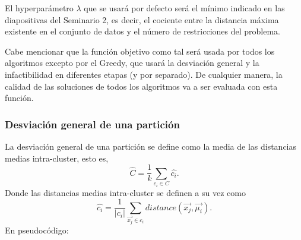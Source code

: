 \documentclass[11pt,a4paper]{article}
\begin{document}
	El hyperparámetro $\lambda$ que se usará por defecto será el mínimo indicado en las diapositivas del Seminario 2, es decir, el cociente entre la distancia máxima existente en el conjunto de datos y el número de restricciones del problema. 
	
	Cabe mencionar que la función objetivo como tal será usada por todos los algoritmos excepto por el Greedy, que usará la desviación general y la infactibilidad en diferentes etapas (y por separado). De cualquier manera, la calidad de las soluciones de todos los algoritmos va a ser evaluada con esta función.
	\subsubsection{Desviación general de una partición}
	La desviación general de una partición se define como la media de las distancias medias intra-cluster, esto es,
	$$\hat{C} = \frac{1}{k} \sum_{c_i \in C} \hat{c_i}.$$ Donde las distancias medias intra-cluster se definen a su vez como $$\hat{c_i} = \frac{1}{|c_i|} \sum_{\vec{x_j} \in c_i}distance(\vec{x_j}, \vec{\mu_i}).$$ En pseudocódigo:
	
\end{document}
